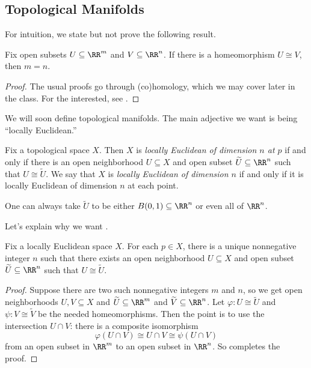 \documentclass[../notes.tex]{subfiles}
\begin{document}
\subsection{Topological Manifolds}
For intuition, we state but not prove the following result.
\begin{theorem} \label{thm:top-inv-dim}
	Fix open subsets $U\subseteq\RR^m$ and $V\subseteq\RR^n$. If there is a homeomorphism $U\cong V$, then $m=n$.
\end{theorem}
\begin{proof}
	The usual proofs go through (co)homology, which we may cover later in the class. For the interested, see \cite[Proposition~3.50]{elber-alg-top}.
\end{proof}
We will soon define topological manifolds. The main adjective we want is being ``locally Euclidean.''
\begin{definition}
	Fix a topological space $X$. Then $X$ is \textit{locally Euclidean of dimension $n$ at $p$} if and only if there is an open neighborhood $U\subseteq X$ and open subset $\widetilde U\subseteq\RR^n$ such that $U\cong\widetilde U$. We say that $X$ is \textit{locally Euclidean of dimension $n$} if and only if it is locally Euclidean of dimension $n$ at each point.
\end{definition}
\begin{remark}
	One can always take $\widetilde U$ to be either $B(0,1)\subseteq\RR^n$ or even all of $\RR^n$.
\end{remark}
Let's explain why we want .
\begin{lemma}
	Fix a locally Euclidean space $X$. For each $p\in X$, there is a unique nonnegative integer $n$ such that there exists an open neighborhood $U\subseteq X$ and open subset $\widetilde U\subseteq\RR^n$ such that $U\cong\widetilde U$.
\end{lemma}
\begin{proof}
	Suppose there are two such nonnegative integers $m$ and $n$, so we get open neighborhoods $U,V\subseteq X$ and $\widetilde U\subseteq\RR^m$ and $\widetilde V\subseteq\RR^n$. Let $\varphi\colon U\cong\widetilde U$ and $\psi\colon V\cong\widetilde V$ be the needed homeomorphisms. Then the point is to use the intersection $U\cap V$: there is a composite isomorphism
	\[\varphi(U\cap V)\cong U\cap V\cong\psi(U\cap V)\]
	from an open subset in $\RR^m$ to an open subset in $\RR^n$. So  completes the proof.
\end{proof}
\end{document}
